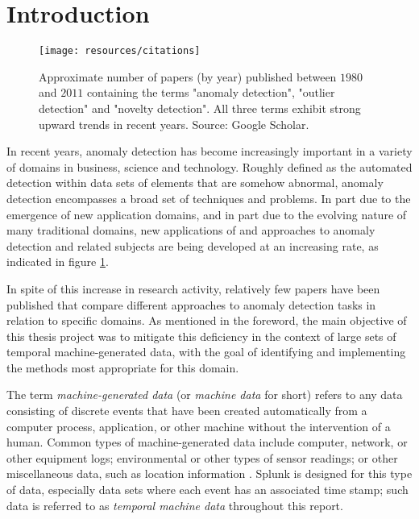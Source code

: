 \chapter*{Introduction}

\begin{figure}[htb]
    \vspace{-20pt}
    \begin{center}
        \texttt{[image: resources/citations]}
    \end{center}
    \vspace{-20pt}
    \caption{\small Approximate number of papers (by year) published between $1980$ and $2011$ containing the terms "anomaly detection", "outlier detection" and "novelty detection". All three terms exhibit strong upward trends in recent years. Source: Google Scholar.}
    \vspace{-0pt}
    \label{fig:citations}
\end{figure}

In recent years, anomaly detection has become increasingly important in a variety of domains in business, science and technology. Roughly defined as the automated detection within data sets of elements that are somehow abnormal, anomaly detection encompasses a broad set of techniques and problems. In part due to the emergence of new application domains, and in part due to the evolving nature of many traditional domains, new applications of and approaches to anomaly detection and related subjects are being developed at an increasing rate, as indicated in figure \ref{fig:citations}.

In spite of this increase in research activity, relatively few papers have been published that compare different approaches to anomaly detection tasks in relation to specific domains. As mentioned in the foreword, the main objective of this thesis project was to mitigate this deficiency in the context of large sets of temporal machine-generated data, with the goal of identifying and implementing the methods most appropriate for this domain.

The term \emph{machine-generated data} (or \emph{machine data} for short) refers to any data consisting of discrete events that have been created automatically from a computer process, application, or other machine without the intervention of a human. Common types of machine-generated data include computer, network, or other equipment logs; environmental or other types of sensor readings; or other miscellaneous data, such as location information \cite{machine_data}. Splunk is designed for this type of data, especially data sets where each event has an associated time stamp; such data is referred to as \emph{temporal machine data} throughout this report.

